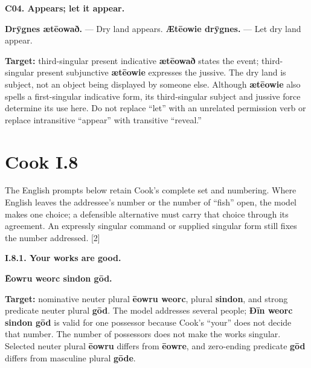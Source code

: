 \par\begin{minipage}{\linewidth}\raggedright
\textbf{C04. Appears; let it appear.}

\textbf{Drȳgnes ætēowað.} — Dry land appears. \textbf{Ætēowie drȳgnes.} — Let dry land appear.

\textbf{Target:} third-singular present indicative \textbf{ætēowað} states the event; third-singular present subjunctive \textbf{ætēowie} expresses the jussive. The dry land is subject, not an object being displayed by someone else. Although \textbf{ætēowie} also spells a first-singular indicative form, its third-singular subject and jussive force determine its use here. Do not replace “let” with an unrelated permission verb or replace intransitive “appear” with transitive “reveal.”

\end{minipage}\par\addvspace{4pt}

\section*{Cook I.8}

The English prompts below retain Cook's complete set and numbering. Where English leaves the addressee's number or the number of “fish” open, the model makes one choice; a defensible alternative must carry that choice through its agreement. An expressly singular command or supplied singular form still fixes the number addressed. [2]

\par\begin{minipage}{\linewidth}\raggedright
\textbf{I.8.1. Your works are good.}

\textbf{Ēowru weorc sindon gōd.}

\textbf{Target:} nominative neuter plural \textbf{ēowru weorc}, plural \textbf{sindon}, and strong predicate neuter plural \textbf{gōd}. The model addresses several people; \textbf{Ðīn weorc sindon gōd} is valid for one possessor because Cook's “your” does not decide that number. The number of possessors does not make the works singular. Selected neuter plural \textbf{ēowru} differs from \textbf{ēowre}, and zero-ending predicate \textbf{gōd} differs from masculine plural \textbf{gōde}.

\end{minipage}\par\addvspace{4pt}

